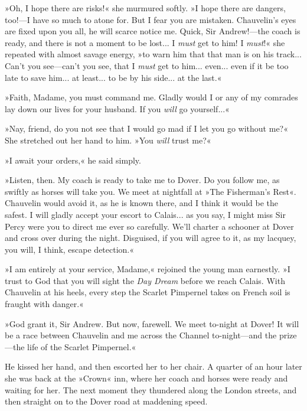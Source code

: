 »Oh, I hope there are risks!« she murmured softly. »I hope there are dangers, too!\allowbreak---\allowbreak I have so much to atone for. But I fear you are mistaken. Chauvelin's eyes are fixed upon you all, he will scarce notice me. Quick, Sir Andrew!\allowbreak---\allowbreak the coach is ready, and there is not a moment to be lost... I \textit{must} get to him! I \textit{must}!« she repeated with almost savage energy, »to warn him that that man is on his track... Can't you see\allowbreak---\allowbreak can't you see, that I \textit{must} get to him... even... even if it be too late to save him... at least... to be by his side... at the last.«

»Faith, Madame, you must command me. Gladly would I or any of my comrades lay down our lives for your husband. If you \textit{will} go yourself...«

»Nay, friend, do you not see that I would go mad if I let you go without me?« She stretched out her hand to him. »You \textit{will} trust me?«

»I await your orders,« he said simply.

»Listen, then. My coach is ready to take me to Dover. Do you follow me, as swiftly as horses will take you. We meet at nightfall at »The Fisherman's Rest«. Chauvelin would avoid it, as he is known there, and I think it would be the safest. I will gladly accept your escort to Calais... as you say, I might miss Sir Percy were you to direct me ever so carefully. We'll charter a schooner at Dover and cross over during the night. Disguised, if you will agree to it, as my lacquey, you will, I think, escape detection.«

»I am entirely at your service, Madame,« rejoined the young man earnestly. »I trust to God that you will sight the \textit{Day Dream} before we reach Calais. With Chauvelin at his heels, every step the Scarlet Pimpernel takes on French soil is fraught with danger.«

»God grant it, Sir Andrew. But now, farewell. We meet to-night at Dover! It will be a race between Chauvelin and me across the Channel to-night\allowbreak---\allowbreak and the prize\allowbreak---\allowbreak the life of the Scarlet Pimpernel.«

He kissed her hand, and then escorted her to her chair. A quarter of an hour later she was back at the »Crown« inn, where her coach and horses were ready and waiting for her. The next moment they thundered along the London streets, and then straight on to the Dover road at maddening speed.

